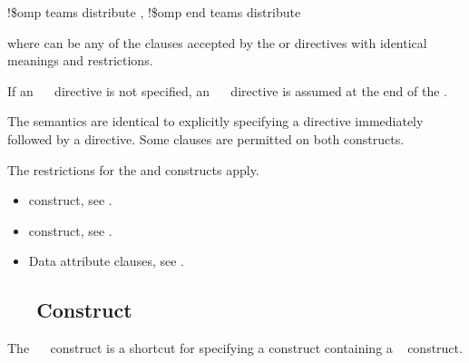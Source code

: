 \fortranspecificstart
\begin{boxedcode}
!\$omp teams distribute \plc{[clause[ [},\plc{] clause] ... ]}
\plc{[}!\$omp end teams distribute\plc{]}
\end{boxedcode}

where  can be any of the clauses accepted by the  or  
directives with identical meanings and restrictions.

If an ~~ directive is not specified, an 
~~ directive is assumed at the end of the .
\fortranspecificend

\descr
The semantics are identical to explicitly specifying a  directive immediately 
followed by a  directive. Some clauses are permitted on both constructs.

\restrictions
The restrictions for the  and  constructs apply.

\crossreferences
\begin{itemize}
\item {} construct, see 
.

\item {} construct, see 
.

\item Data attribute clauses, see 
.
\end{itemize}












\subsection{~~ Construct}
\label{subsec:teams distribute simd Construct}
\summary
The ~~ construct is a shortcut for specifying a  construct 
containing a ~ construct.

